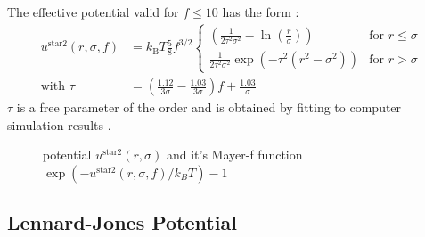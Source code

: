 The effective potential valid for $f\leq 10$ has the form
\cite{Jusufi2001,Dzubiella2001,Likos2001}:
\begin{align}
u^\text{star2}(r,\sigma,f) &=
k_\text{B} T \frac{5}{8} f^{3/2}
\begin{cases}
\left(\frac{1}{2\tau^2\sigma^2}-\ln\left(\frac{r}{\sigma}\right) \right)
          & \mbox{for } r \leq \sigma \\
\frac{1}{2\tau^2\sigma^2}
\exp\left(-\tau^2(r^2-\sigma^2)\right)
          & \mbox{for } r >    \sigma
\end{cases} \\
\mbox{with } \tau &= \left(\frac{1.12}{3\sigma}-\frac{1.03}{3\sigma}\right)f+\frac{1.03}{\sigma}
\end{align}
$\tau$ is a free parameter of the order and is obtained by fitting to computer
simulation results \cite{Dzubiella2001}.

\begin{figure}[htb]
\centering
  \quad
  \caption{potential $u^\text{star2}(r,\sigma)$ and it's Mayer-f function $\exp(-u^\text{star2}(r,\sigma,f)/k_BT)-1$}
\end{figure}

\newpage
\subsection{Lennard-Jones Potential}
~\\

